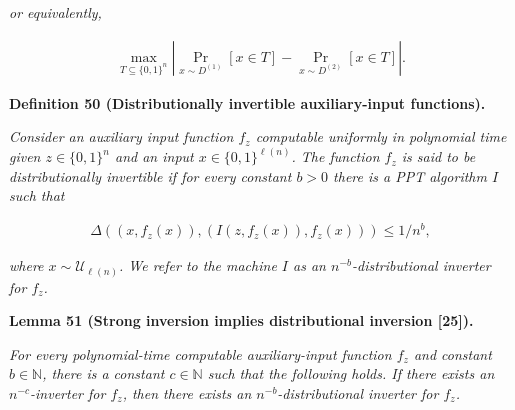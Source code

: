 \documentclass[10pt,a4paper]{article}
\begin{document}
\emph{or equivalently,}\par


\[\begin{gathered}
\mathop{\max}_{T\subseteq\{0,1\}^{n}}\left|\Pr_{x\sim D^{(1)}}[x\in T]-\Pr_{x\sim D^{(2)}}[x\in T]\right|.
\end{gathered}\]







\par\medskip\noindent\textbf{
\textbf{Definition 50}\textbf{ }(Distributionally invertible auxiliary-input functions)\textbf{.}
}\par



\emph{Consider an auxiliary input function $f_{z}$ computable uniformly in polynomial time given $z\in\{0,1\}^{n}$ and an input $x\in\{0,1\}^{\ell(n)}$. The function $f_{z}$ is said to be distributionally invertible if for every constant $b>0$ there is a PPT algorithm $I$ such that}\par


\[\begin{gathered}
\Delta((x,f_{z}(x)),(I(z,f_{z}(x)),f_{z}(x)))\leq 1/n^{b},
\end{gathered}\]


\emph{where $x\sim\mathcal{U}_{\ell(n)}$. We refer to the machine $I$ as an $n^{-b}$-distributional inverter for $f_{z}$.}\par







\par\medskip\noindent\textbf{
\textbf{Lemma 51}\textbf{ }(Strong inversion implies distributional inversion [25])\textbf{.}
}\par



\emph{For every polynomial-time computable auxiliary-input function $f_{z}$ and constant $b\in\mathbb{N}$, there is a constant $c\in\mathbb{N}$ such that the following holds. If there exists an $n^{-c}$-inverter for $f_{z}$, then there exists an $n^{-b}$-distributional inverter for $f_{z}$.}\par



\end{document}
